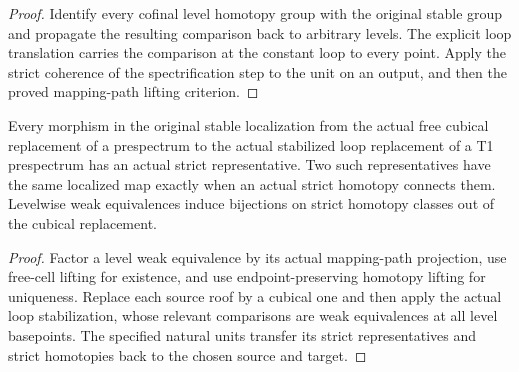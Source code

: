 \begin{proof}
  Identify every cofinal level homotopy group with the original stable group and propagate the resulting comparison back to arbitrary levels. The explicit loop translation carries the comparison at the constant loop to every point. Apply the strict coherence of the spectrification step to the unit on an output, and then the proved mapping-path lifting criterion.
  \leanok
\end{proof}

\begin{proposition}
  \label{prop:actual-cubical-source-mapping-class-representation}
  \leanok
  Every morphism in the original stable localization from the actual free cubical replacement of a prespectrum to the actual stabilized loop replacement of a T1 prespectrum has an actual strict representative. Two such representatives have the same localized map exactly when an actual strict homotopy connects them. Levelwise weak equivalences induce bijections on strict homotopy classes out of the cubical replacement.
\end{proposition}
\begin{proof}
  Factor a level weak equivalence by its actual mapping-path projection, use free-cell lifting for existence, and use endpoint-preserving homotopy lifting for uniqueness. Replace each source roof by a cubical one and then apply the actual loop stabilization, whose relevant comparisons are weak equivalences at all level basepoints. The specified natural units transfer its strict representatives and strict homotopies back to the chosen source and target.
  \leanok
\end{proof}

